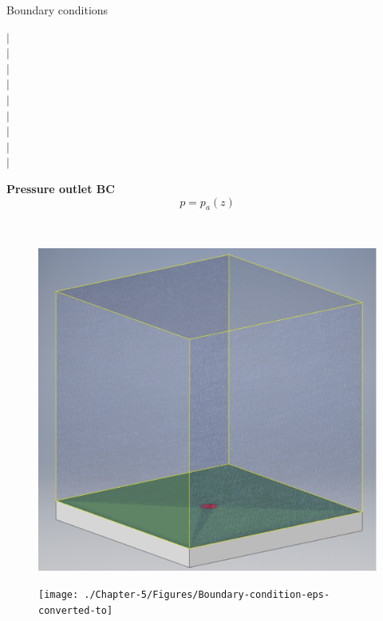 \documentclass{beamer}
\begin{document}
\begin{frame}{Boundary conditions}
\begin{minipage}{.01\textwidth}
$\vert$\\
$\vert$\\
$\vert$\\
$\vert$\\
$\vert$\\
$\vert$\\
$\vert$\\
$\vert$\\
$\vert$\\
\end{minipage}
\begin{minipage}{.560\textwidth}
\begin{minipage}[!t]{\textwidth}
\textbf{Pressure outlet BC}
\begin{equation}
p = p_a\left(z\right)\label{eq:pressure_bc_p} 
\end{equation} 
\end{minipage}
%
\\[20mm]
%
\begin{minipage}{0.49\textwidth}
\begin{figure}[!t]
\centering
\includegraphics[width=.99\textwidth]{./Chapter-2/Figures/Domain_good}
\label{fig:Domain_3D}
\end{figure}
\end{minipage}
\begin{minipage}{0.49\textwidth}
\begin{figure}[!t]
\centering
\texttt{[image: ./Chapter-5/Figures/Boundary-condition-eps-converted-to]}
\end{figure}
\end{minipage}
%
\end{minipage}
%
\end{frame}
\end{document}
